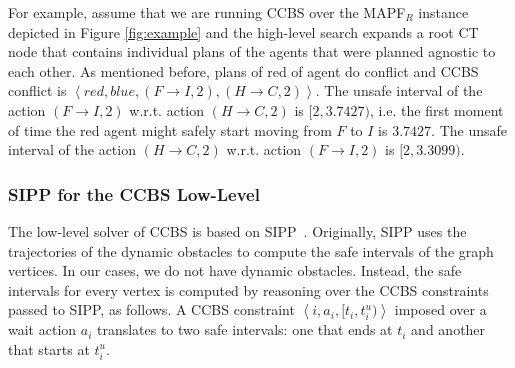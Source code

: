 \documentclass[review]{elsarticle}
\newcommand{\tuple}[1]{\ensuremath{\left \langle #1 \right \rangle }}
\newcommand\konstantin[1]{\nb{\textbf{Konstantin:}}{red}{#1}}
\newcommand{\ccbs}{\ac{CCBS}\xspace}
\newcommand{\ct}{\ac{CT}\xspace}
\newcommand{\sipp}{\ac{SIPP}\xspace}
\newcommand{\mapfr}{\ac{MAPF}$_R$\xspace}
\begin{document}

For example, assume that we are running \ccbs over the \mapfr instance depicted in Figure \ref{fig:example} and the high-level search expands a root \ct node that contains individual plans of the agents that were planned agnostic to each other. As mentioned before, plans of red of agent do conflict and \ccbs conflict is $\tuple{red, blue, (F \rightarrow I, 2), (H \rightarrow C, 2)}$. The unsafe interval of the action $(F \rightarrow I, 2)$ w.r.t. action $(H \rightarrow C, 2)$ is $[2, 3.7427)$, i.e. the first moment of time the red agent might safely start moving from $F$ to $I$ is $3.7427$. The unsafe interval of the action $(H \rightarrow C, 2)$ w.r.t. action $(F \rightarrow I, 2)$ is $[2, 3.3099)$.



\subsubsection{\sipp for the \ccbs Low-Level}
The low-level solver of \ccbs is based on \sipp~\cite{phillips2011sipp}. 
Originally, \sipp uses the trajectories of the dynamic obstacles to compute the safe intervals of the graph vertices. In our cases, we do not have dynamic obstacles. Instead, the safe intervals for every vertex is computed by reasoning over the \ccbs constraints passed to \sipp, as follows. A \ccbs constraint $\tuple{i, a_i, [t_i, t^u_i)}$ imposed over a wait action $a_i$ translates to two safe intervals: one that ends at $t_i$ and another that starts at $t^u_i$. 
\end{document}
